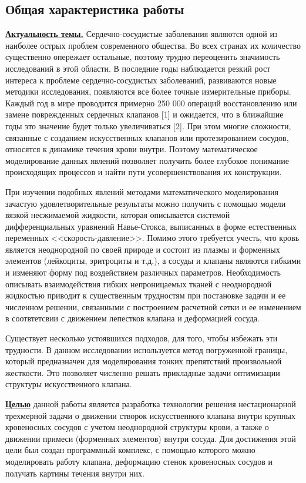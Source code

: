 \subsection*{\Large Общая характеристика работы}
\fontsize{14pt}{15pt}\selectfont
\underline{\textbf{Актуальность темы.}}
Сердечно-сосудистые заболевания являются одной из наиболее острых проблем современного общества. Во всех странах их количество существенно опережает остальные, поэтому трудно переоценить значимость исследований в этой области. В последние годы наблюдается резкий рост интереса к проблеме сердечно-сосудистых заболеваний, развиваются новые методики исследования, появляются все более точные измерительные приборы. Каждый год в мире проводится примерно 250 000 операций восстановлению или замене поврежденных сердечных клапанов [1] и ожидается, что в ближайшие годы это значение будет только увеличиваться [2]. При этом многие сложности, связанные с созданием искусственных клапанов или протезированием сосудов, относятся к динамике течения крови внутри. Поэтому математическое моделирование данных явлений позволяет получить более глубокое понимание происходящих процессов и найти пути усовершенствования их конструкции. 

При изучении подобных явлений методами математического моделирования зачастую удовлетворительные результаты можно получить с помощью модели вязкой несжимаемой жидкости, которая описывается системой дифференциальных уравнений Навье-Стокса, выписанных в форме естественных переменных <<скорость-давление>>. Помимо этого требуется учесть, что кровь является неоднородной по своей природе и состоит из плазмы и форменных элементов (лейкоциты, эритроциты и т.д.), а сосуды и клапаны являются гибкими и изменяют форму под воздействием различных параметров. Необходимость описывать взаимодействия гибких непроницаемых тканей с неоднородной жидкостью приводит к существенным трудностям при постановке задачи и ее численном решении, связанными с построением расчетной сетки и ее изменением в соотвтетсвии с движением лепестков клапана и деформацией сосуда. 

Существует несколько устоявшихся подходов, для того, чтобы избежать эти трудности. В данном исследовании используется метод погруженной границы, который предназначен для моделирования тонких препятствий произвольной жесткости. Это позволяет численно решать прикладные задачи оптимизации структуры искусственного клапана.


\underline{\textbf{Целью}} данной работы является разработка технологии решения нестационарной трехмерной задачи о движении створок искусственного клапана внутри крупных кровеносных сосудов с учетом неоднородной структуры крови, а также о движении примеси (форменных элементов) внутри сосуда. Для достижения этой цели был создан программный комплекс, с помощью которого можно моделировать работу клапана, деформацию стенок кровеносных сосудов и получать картины течения внутри них.

